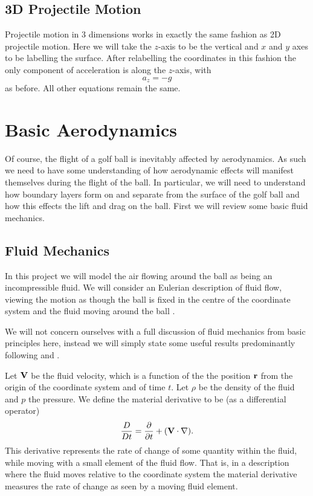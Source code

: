 \subsection{3D Projectile Motion}

Projectile motion in 3 dimensions works in exactly the same fashion as 2D projectile motion. Here we
will take the $z$-axis to be the vertical and $x$ and $y$ axes to be labelling the surface. After 
relabelling the coordinates in this fashion the only
component of acceleration is along the $z$-axis, with
\[
a_z = -g
\]
as before. All other equations remain the same.

\section{Basic Aerodynamics}

Of course, the flight of a golf ball is inevitably affected by aerodynamics. As such we need to have
some understanding of how aerodynamic effects will manifest themselves during the flight of the ball. 
In particular, we will need to understand how boundary layers
form on and separate from the surface of the golf ball and how this effects the lift and drag on the ball.
First we will review some basic fluid mechanics.

\subsection{Fluid Mechanics}

In this project we will model the air flowing around the ball as being an incompressible fluid. We will
consider an Eulerian description of fluid flow, viewing the motion as though the ball is fixed in the centre
of the coordinate system and the fluid moving around the ball \citet{Ruban2014}.

We will not concern ourselves with a full discussion of fluid mechanics from basic principles here, 
instead we will simply state some useful results predominantly following \citet{Ruban2014} and 
\citet{sears}.

Let $\mathbf{V}$ be the fluid velocity, which is a function of the the position $\mathbf{r}$ from the origin of the
coordinate system and of time $t$. Let $\rho$ be the density of the fluid and $p$ the pressure. 
We define the material derivative to be (as a differential operator)
\begin{equation} \nonumber
\frac{D}{Dt} = \frac{\partial}{\partial t} + (\mathbf{V} \cdot \nabla) .
\end{equation}
This derivative represents the rate of change of some quantity within the fluid, while moving with a small element
of the fluid flow. That is, in a description where the fluid moves relative to the coordinate system
the material derivative measures the rate of change as seen by a moving fluid element.


